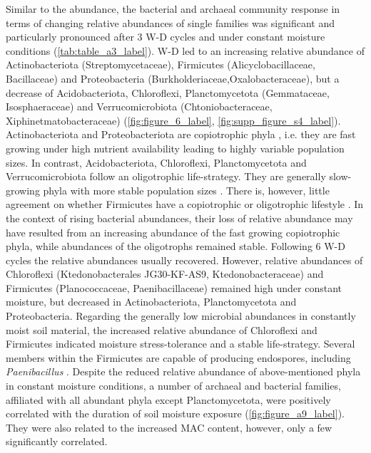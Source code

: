 Similar to the abundance, the bacterial and archaeal community response in terms of changing relative abundances of single families was significant and particularly pronounced after 3 W-D cycles and under constant moisture conditions (\cref{tab:table_a3_label}). 
W-D led to an increasing relative abundance of Actinobacteriota (Streptomycetaceae), Firmicutes (Alicyclobacillaceae, Bacillaceae) and Proteobacteria (Burkholderiaceae,Oxalobacteraceae), but a decrease of Acidobacteriota, Chloroflexi, Planctomycetota (Gemmataceae, Isosphaeraceae) and Verrucomicrobiota (Chtoniobacteraceae, Xiphinetmatobacteraceae) (\cref{fig:figure_6_label}, \cref{fig:supp_figure_s4_label}). 
Actinobacteriota and Proteobacteriota are copiotrophic phyla \citep{Finn2021, Li2021}, i.e. they are fast growing under high nutrient availability leading to highly variable population sizes. 
In contrast, Acidobacteriota, Chloroflexi, Planctomycetota and Verrucomicrobiota follow an oligotrophic life-strategy. 
They are generally slow-growing phyla with more stable population sizes \citep{Barnard2013, DelgadoBaquerizo2017a}. 
There is, however, little agreement on whether Firmicutes have a copiotrophic or oligotrophic lifestyle \citep{Schostag2019}. 
In the context of rising bacterial abundances, their loss of relative abundance may have resulted from an increasing abundance of the fast growing copiotrophic phyla, while abundances of the oligotrophs remained stable. 
Following 6 W-D cycles the relative abundances usually recovered. 
However, relative abundances of Chloroflexi (Ktedonobacterales JG30-KF-AS9, Ktedonobacteraceae) and Firmicutes (Planococcaceae, Paenibacillaceae) remained high under constant moisture, but decreased in Actinobacteriota, Planctomycetota and Proteobacteria. 
Regarding the generally low microbial abundances in constantly moist soil material, the increased relative abundance of Chloroflexi and Firmicutes indicated moisture stress-tolerance and a stable life-strategy. 
Several members within the Firmicutes are capable of producing endospores, including \textit{Paenibacillus} \citep{Paredes2005, Schostag2019}. 
Despite the reduced relative abundance of above-mentioned phyla in constant moisture conditions, a number of archaeal and bacterial families, affiliated with all abundant phyla except Planctomycetota, were positively correlated with the duration of soil moisture exposure (\cref{fig:figure_a9_label}). 
They were also related to the increased MAC content, however, only a few significantly correlated.

